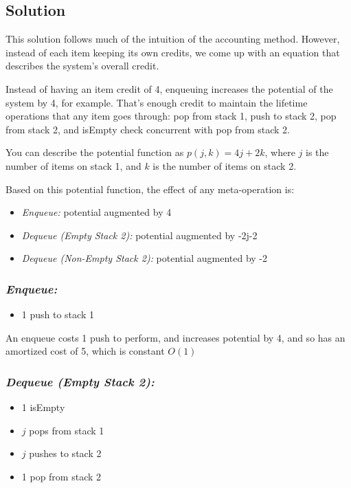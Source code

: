 \subsection*{Solution}
This solution follows much of the intuition of the accounting method. However, instead of each item keeping its own credits, we come up with an equation that describes the system's overall credit.

Instead of having an item credit of 4, enqueuing increases the potential of the system by 4, for example. That's enough credit to maintain the lifetime operations that any item goes through: pop from stack 1, push to stack 2, pop from stack 2, and isEmpty check concurrent with pop from stack 2.

You can describe the potential function as $p(j,k) = 4j + 2k$, where $j$ is the number of items on stack 1, and $k$ is the number of items on stack 2.

Based on this potential function, the effect of any meta-operation is:
\begin{itemize}
\item {\em Enqueue:} potential augmented by 4 
\item {\em Dequeue (Empty Stack 2):} potential augmented by -2j-2
\item {\em Dequeue (Non-Empty Stack 2):} potential augmented by -2
\end{itemize}

\subsubsection*{\em Enqueue:} 
\begin{itemize}
\item 1 push to stack 1
\end{itemize}

An enqueue costs 1 push to perform, and increases potential by 4, and so has an amortized cost of 5, which is constant $O(1)$

\subsubsection*{\em Dequeue (Empty Stack 2):}
\begin{itemize}
\item 1 isEmpty 
\item $j$ pops from stack 1
\item $j$ pushes to stack 2 
\item 1 pop from stack 2
\end{itemize}

